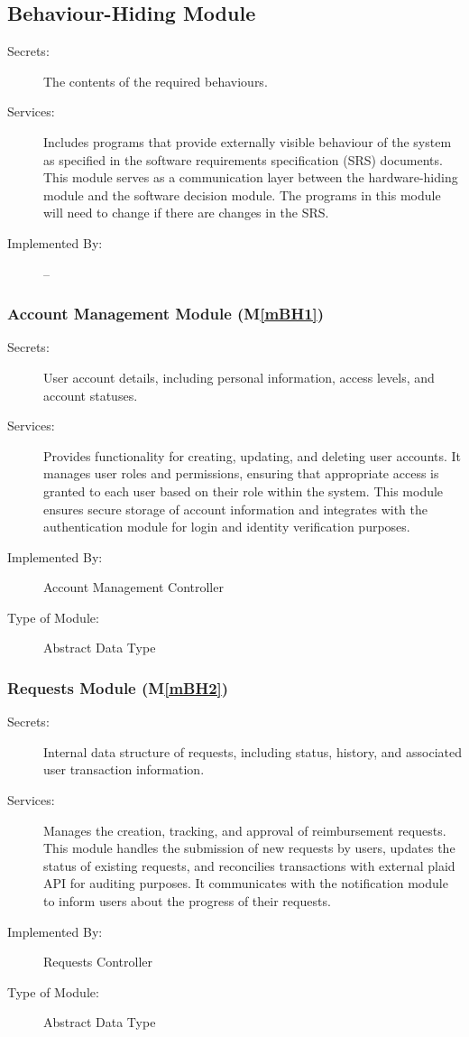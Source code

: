 \documentclass[12pt, titlepage]{article}
\newcommand{\mref}[1]{M\ref{#1}}
\begin{document}
\subsection{Behaviour-Hiding Module}

\begin{description}
\item[Secrets:]The contents of the required behaviours.
\item[Services:]Includes programs that provide externally visible behaviour of
  the system as specified in the software requirements specification (SRS)
  documents. This module serves as a communication layer between the
  hardware-hiding module and the software decision module. The programs in this
  module will need to change if there are changes in the SRS.
\item[Implemented By:] --
\end{description}

\subsubsection{Account Management Module (\mref{mBH1})}

\begin{description}
\item[Secrets:] User account details, including personal information, access levels, and account statuses.
\item[Services:] Provides functionality for creating, updating, and deleting user accounts. It manages user roles and permissions, ensuring that appropriate access is granted to each user based on their role within the system. This module ensures secure storage of account information and integrates with the authentication module for login and identity verification purposes.
\item[Implemented By:] Account Management Controller
\item[Type of Module:] Abstract Data Type
\end{description}

\subsubsection{Requests Module (\mref{mBH2})}

\begin{description}
\item[Secrets:] Internal data structure of requests, including status, history, and associated user transaction information.
\item[Services:] Manages the creation, tracking, and approval of reimbursement requests. This module handles the submission of new requests by users, updates the status of existing requests, and reconcilies transactions with external plaid API for auditing purposes. It communicates with the notification module to inform users about the progress of their requests.
\item[Implemented By:] Requests Controller
\item[Type of Module:] Abstract Data Type
\end{description}
\end{document}
